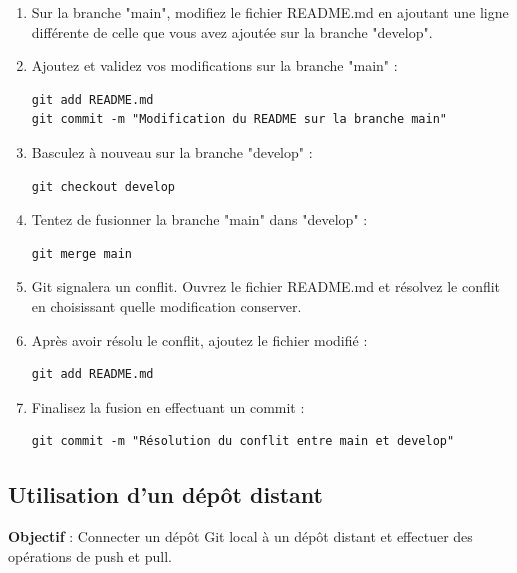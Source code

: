 \begin{enumerate}
	\item Sur la branche "main", modifiez le fichier README.md en ajoutant une ligne différente de celle que vous avez ajoutée sur la branche "develop".
	\item Ajoutez et validez vos modifications sur la branche "main" :
	\begin{verbatim}
git add README.md
git commit -m "Modification du README sur la branche main"
	\end{verbatim}
	\item Basculez à nouveau sur la branche "develop" :
	\begin{verbatim}
git checkout develop
	\end{verbatim}
	\item Tentez de fusionner la branche "main" dans "develop" :
	\begin{verbatim}
git merge main
	\end{verbatim}
	\item Git signalera un conflit. Ouvrez le fichier README.md et résolvez le conflit en choisissant quelle modification conserver.
	\item Après avoir résolu le conflit, ajoutez le fichier modifié :
	\begin{verbatim}
git add README.md
	\end{verbatim}
	\item Finalisez la fusion en effectuant un commit :
	\begin{verbatim}
git commit -m "Résolution du conflit entre main et develop"
	\end{verbatim}
\end{enumerate}

\subsection*{Utilisation d'un dépôt distant}
{}
\noindent \textbf{Objectif} : Connecter un dépôt Git local à un dépôt distant et effectuer des opérations de push et pull.

